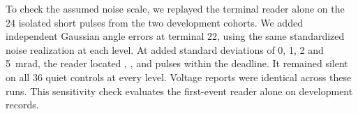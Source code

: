 To check the assumed noise scale, we replayed the terminal reader
alone on the 24 isolated short pulses from the two development
cohorts. We added independent Gaussian angle errors at terminal 22,
using the same standardized noise realization at each level. At
added standard deviations of 0, 1, 2 and 5~mrad, the reader located
\TorqueStressZero{}, \TorqueStressOne{}, \TorqueStressTwo{} and
\TorqueStressFive{} pulses within the deadline. It remained silent on
all 36 quiet controls at every level. Voltage reports were identical
across these runs. This sensitivity check evaluates the first-event
reader alone on development records.


